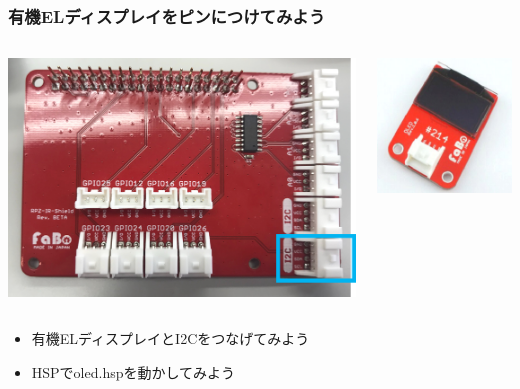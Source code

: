 \begin{frame}[fragile]
    \frametitle{有機ELディスプレイをピンにつけてみよう}
    \begin{columns}
        \begin{column}{0.48\textwidth}
            \includegraphics[width=\textwidth]{images/chap05/text05-img033.png} 
        \end{column}
        \begin{column}{0.48\textwidth}
            \includegraphics[width=\textwidth]{images/chap05/text05-img025.png} 
        \end{column}
    \end{columns}
    \begin{itemize}
        \item 有機ELディスプレイとI2Cをつなげてみよう
        \item HSPでoled.hspを動かしてみよう
    \end{itemize}
\end{frame}

